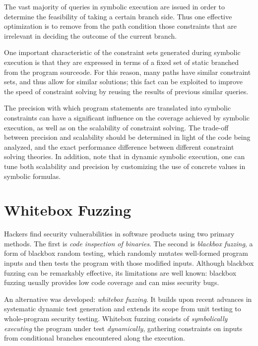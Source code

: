 The vast majority of queries in symbolic execution are issued in order to determine the feasibility of taking a certain branch side. Thus one effective optimization is to remove from the path condition those constraints that are irrelevant in deciding the outcome of the current branch.

One important characteristic of the constraint sets generated during symbolic execution is that they are expressed in terms of a fixed set of static branched from the program sourceode. For this reason, many paths have similar constraint sets, and thus allow for similar solutions; this fact can be exploited to improve the speed of constraint solving by reusing the results of previous similar queries.

The precision with which program statements are translated into symbolic constraints can have a significant influence on the coverage achieved by symbolic execution, as well as on the scalability of constraint solving.
The trade-off between precision and scalability should be determined in light of the code being analyzed, and the exact performance difference between different constraint solving theories. In addition, note that in dynamic symbolic execution, one can tune both scalability and precision by customizing the use of concrete values in symbolic formulas.

\section{Whitebox Fuzzing\cite{godefroid2012sage}\cite{godefroid2008grammar}\cite{godefroid2008automated}}

Hackers find security vulnerabilities in software products using two primary methods. The first is \textit{code inspection of binaries}. The second is \textit{blackbox fuzzing}, a form of blackbox random testing, which randomly mutates well-formed program inputs and then tests the program with those modified inputs.
Although blackbox fuzzing can be remarkably effective, its limitations are well known: blackbox fuzzing usually provides low code coverage and can miss security bugs.

An alternative was developed: \textit{whitebox fuzzing}. It builds upon recent advances in systematic dynamic test generation and extends its scope from unit testing to whole-program security testing.
Whitebox fuzzing consists of \textit{symbolically executing} the program under test \textit{dynamically}, gathering constraints on inputs from conditional branches encountered along the execution.

